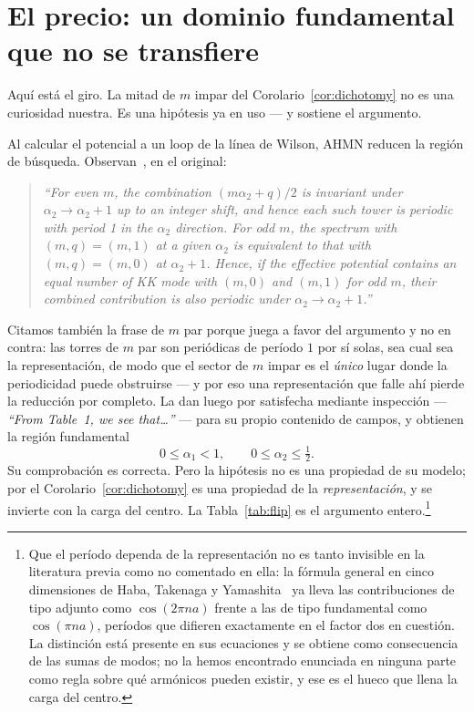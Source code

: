 \documentclass[11pt,a4paper]{article}
\begin{document}
\section{El precio: un dominio fundamental que no se transfiere}\label{sec:domain}
Aquí está el giro. La mitad de $m$ impar del Corolario~\ref{cor:dichotomy} no es una
curiosidad nuestra. Es una hipótesis ya en uso --- y sostiene el argumento.

Al calcular el potencial a un loop de la línea de Wilson, AHMN reducen la región de búsqueda.
Observan~\cite[\S4.3]{AHMN}, en el original:
\begin{quote}\itshape
``For even $m$, the combination $(m\alpha_2+q)/2$ is invariant under
$\alpha_2\to\alpha_2+1$ up to an integer shift, and hence each such tower is periodic with
period 1 in the $\alpha_2$ direction. For odd $m$, the spectrum with $(m,q)=(m,1)$ at a given
$\alpha_2$ is equivalent to that with $(m,q)=(m,0)$ at $\alpha_2+1$. Hence, if the effective
potential contains an equal number of KK mode with $(m,0)$ and $(m,1)$ for odd $m$, their
combined contribution is also periodic under $\alpha_2\to\alpha_2+1$.''
\end{quote}
Citamos también la frase de $m$ par porque juega a favor del argumento y no en contra: las
torres de $m$ par son periódicas de período $1$ por sí solas, sea cual sea la representación,
de modo que el sector de $m$ impar es el \emph{único} lugar donde la periodicidad puede
obstruirse --- y por eso una representación que falle ahí pierde la reducción por completo.
La dan luego por satisfecha mediante inspección --- \emph{``From Table~1, we see that\dots''} ---
para su propio contenido de campos, y obtienen la región
fundamental~\cite[Ec.~(4.15)]{AHMN}
\begin{equation}\label{eq:region}
0\le\alpha_1<1,\qquad 0\le\alpha_2\le\tfrac12 .
\end{equation}
Su comprobación es correcta. Pero la hipótesis no es una propiedad de su modelo; por el
Corolario~\ref{cor:dichotomy} es una propiedad de la \emph{representación}, y se invierte con
la carga del centro. La Tabla~\ref{tab:flip} es el argumento entero.\footnote{Que el período
dependa de la representación no es tanto invisible en la literatura previa como no comentado
en ella: la fórmula general en cinco dimensiones de Haba, Takenaga y Yamashita~\cite{HTY} ya
lleva las contribuciones de tipo adjunto como $\cos(2\pi n a)$ frente a las de tipo fundamental
como $\cos(\pi n a)$, períodos que difieren exactamente en el factor dos en cuestión. La
distinción está presente en sus ecuaciones y se obtiene como consecuencia de las sumas de
modos; no la hemos encontrado enunciada en ninguna parte como regla sobre qué armónicos pueden
existir, y ese es el hueco que llena la carga del centro.}
\end{document}
